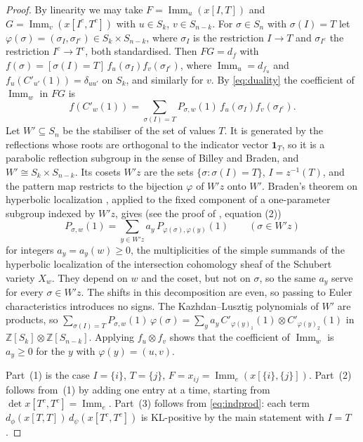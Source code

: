 \documentclass[11pt]{amsart}
\theoremstyle{definition}
\theoremstyle{remark}
\newcommand{\Z}{\mathbb{Z}}
\newcommand{\Imm}{\operatorname{Imm}}
\newcommand{\Cp}[1]{C'_{#1}(1)}
\begin{document}
\begin{proof}
By linearity we may take $F=\Imm_u(x[I,T])$ and $G=\Imm_v(x[I^c,T^c])$ with $u\in S_k$, $v\in S_{n-k}$. For $\sigma\in S_n$ with $\sigma(I)=T$ let $\varphi(\sigma)=(\sigma_I,\sigma_{I^c})\in S_k\times S_{n-k}$, where $\sigma_I$ is the restriction $I\to T$ and $\sigma_{I^c}$ the restriction $I^c\to T^c$, both standardised. Then $FG=d_f$ with $f(\sigma)=[\sigma(I)=T]\,f_u(\sigma_I)f_v(\sigma_{I^c})$, where $\Imm_u=d_{f_u}$ and $f_u(\Cp{u'})=\delta_{uu'}$ on $S_k$, and similarly for $v$. By \eqref{eq:duality} the coefficient of $\Imm_w$ in $FG$ is
\[
f(\Cp w)=\sum_{\sigma(I)=T}P_{\sigma,w}(1)\,f_u(\sigma_I)f_v(\sigma_{I^c}).
\]
Let $W'\subseteq S_n$ be the stabiliser of the set of values $T$. It is generated by the reflections whose roots are orthogonal to the indicator vector $\mathbf 1_T$, so it is a parabolic reflection subgroup in the sense of Billey and Braden, and $W'\cong S_k\times S_{n-k}$. Its cosets $W'z$ are the sets $\{\sigma:\sigma(I)=T\}$, $I=z^{-1}(T)$, and the pattern map restricts to the bijection $\varphi$ of $W'z$ onto $W'$. Braden's theorem on hyperbolic localization \cite{Bra03}, applied to the fixed component of a one-parameter subgroup indexed by $W'z$, gives (see the proof of \cite[Thm.~4]{BB03}, equation (2))
\begin{equation}\label{eq:BB}
P_{\sigma,w}(1)=\sum_{y\in W'z}a_y\,P_{\varphi(\sigma),\varphi(y)}(1)\qquad(\sigma\in W'z)
\end{equation}
for integers $a_y=a_y(w)\ge0$, the multiplicities of the simple summands of the hyperbolic localization of the intersection cohomology sheaf of the Schubert variety $X_w$. They depend on $w$ and the coset, but not on $\sigma$, so the same $a_y$ serve for every $\sigma\in W'z$. The shifts in this decomposition are even, so passing to Euler characteristics introduces no signs. The Kazhdan--Lusztig polynomials of $W'$ are products, so $\sum_{\sigma(I)=T}P_{\sigma,w}(1)\,\varphi(\sigma)=\sum_ya_y\,\Cp{\varphi(y)_1}\otimes\Cp{\varphi(y)_2}$ in $\Z[S_k]\otimes\Z[S_{n-k}]$. Applying $f_u\otimes f_v$ shows that the coefficient of $\Imm_w$ is $a_y\ge0$ for the $y$ with $\varphi(y)=(u,v)$.

Part~(1) is the case $I=\{i\}$, $T=\{j\}$, $F=x_{ij}=\Imm_e(x[\{i\},\{j\}])$. Part~(2) follows from~(1) by adding one entry at a time, starting from $\det x[T^c,T^c]=\Imm_e$. Part~(3) follows from \eqref{eq:indprod}: each term $d_\phi(x[T,T])\,d_\psi(x[T^c,T^c])$ is KL-positive by the main statement with $I=T$.
\end{proof}
\end{document}
